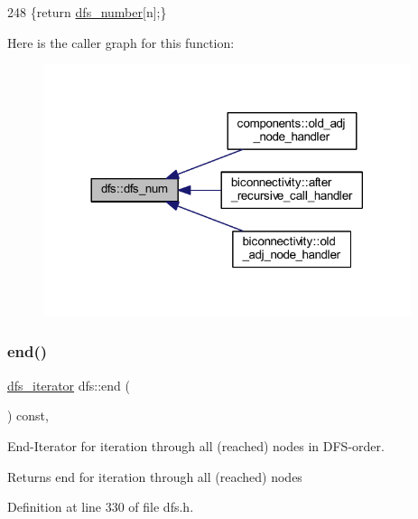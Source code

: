 \begin{DoxyCode}
248     \{\textcolor{keywordflow}{return} \mbox{\hyperlink{classdfs_a99727f2274d6af63daae4f0518f3adbe}{dfs\_number}}[n];\}
\end{DoxyCode}
Here is the caller graph for this function\+:\nopagebreak
\begin{figure}[H]
\begin{center}
\leavevmode
\includegraphics[width=305pt]{classdfs_a315f16831a0bd333960e87e045cb37c8_icgraph}
\end{center}
\end{figure}
\mbox{\label{classdfs_af847633fa642258d3522e8deb26aef37}} 
\subsubsection{\texorpdfstring{end()}{end()}}
{\footnotesize\ttfamily \mbox{\hyperlink{classdfs_a15fe023a5a1f7ddda00f3d87110d9a32}{dfs\+\_\+iterator}} dfs\+::end (\begin{DoxyParamCaption}{ }\end{DoxyParamCaption}) const\hspace{0.3cm}{\ttfamily [inline]}, {\ttfamily [inherited]}}



End-\/\+Iterator for iteration through all (reached) nodes in D\+F\+S-\/order. 

\begin{DoxyReturn}{Returns}
end for iteration through all (reached) nodes 
\end{DoxyReturn}


Definition at line 330 of file dfs.\+h.


